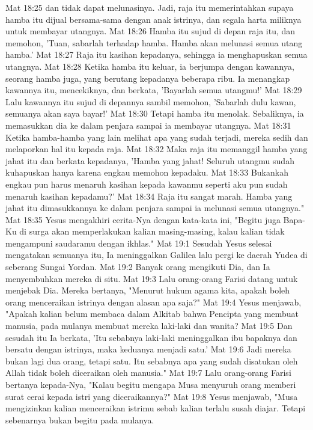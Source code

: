 Mat 18:25  dan tidak dapat melunasinya. Jadi, raja itu memerintahkan supaya hamba itu dijual bersama-sama dengan anak istrinya, dan segala harta miliknya untuk membayar utangnya.
Mat 18:26  Hamba itu sujud di depan raja itu, dan memohon, 'Tuan, sabarlah terhadap hamba. Hamba akan melunasi semua utang hamba.'
Mat 18:27  Raja itu kasihan kepadanya, sehingga ia menghapuskan semua utangnya.
Mat 18:28  Ketika hamba itu keluar, ia berjumpa dengan kawannya, seorang hamba juga, yang berutang kepadanya beberapa ribu. Ia menangkap kawannya itu, mencekiknya, dan berkata, 'Bayarlah semua utangmu!'
Mat 18:29  Lalu kawannya itu sujud di depannya sambil memohon, 'Sabarlah dulu kawan, semuanya akan saya bayar!'
Mat 18:30  Tetapi hamba itu menolak. Sebaliknya, ia memasukkan dia ke dalam penjara sampai ia membayar utangnya.
Mat 18:31  Ketika hamba-hamba yang lain melihat apa yang sudah terjadi, mereka sedih dan melaporkan hal itu kepada raja.
Mat 18:32  Maka raja itu memanggil hamba yang jahat itu dan berkata kepadanya, 'Hamba yang jahat! Seluruh utangmu sudah kuhapuskan hanya karena engkau memohon kepadaku.
Mat 18:33  Bukankah engkau pun harus menaruh kasihan kepada kawanmu seperti aku pun sudah menaruh kasihan kepadamu?'
Mat 18:34  Raja itu sangat marah. Hamba yang jahat itu dimasukkannya ke dalam penjara sampai ia melunasi semua utangnya."
Mat 18:35  Yesus mengakhiri cerita-Nya dengan kata-kata ini, "Begitu juga Bapa-Ku di surga akan memperlakukan kalian masing-masing, kalau kalian tidak mengampuni saudaramu dengan ikhlas."
Mat 19:1  Sesudah Yesus selesai mengatakan semuanya itu, Ia meninggalkan Galilea lalu pergi ke daerah Yudea di seberang Sungai Yordan.
Mat 19:2  Banyak orang mengikuti Dia, dan Ia menyembuhkan mereka di situ.
Mat 19:3  Lalu orang-orang Farisi datang untuk menjebak Dia. Mereka bertanya, "Menurut hukum agama kita, apakah boleh orang menceraikan istrinya dengan alasan apa saja?"
Mat 19:4  Yesus menjawab, "Apakah kalian belum membaca dalam Alkitab bahwa Pencipta yang membuat manusia, pada mulanya membuat mereka laki-laki dan wanita?
Mat 19:5  Dan sesudah itu Ia berkata, 'Itu sebabnya laki-laki meninggalkan ibu bapaknya dan bersatu dengan istrinya, maka keduanya menjadi satu.'
Mat 19:6  Jadi mereka bukan lagi dua orang, tetapi satu. Itu sebabnya apa yang sudah disatukan oleh Allah tidak boleh diceraikan oleh manusia."
Mat 19:7  Lalu orang-orang Farisi bertanya kepada-Nya, "Kalau begitu mengapa Musa menyuruh orang memberi surat cerai kepada istri yang diceraikannya?"
Mat 19:8  Yesus menjawab, "Musa mengizinkan kalian menceraikan istrimu sebab kalian terlalu susah diajar. Tetapi sebenarnya bukan begitu pada mulanya.
